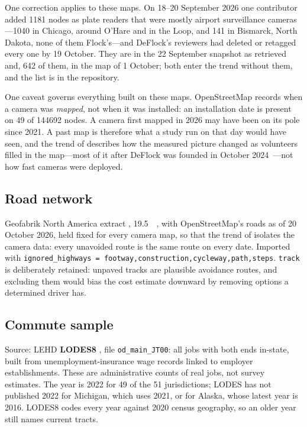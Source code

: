 \documentclass[11pt,twoside]{article}
\begin{document}
One correction applies to these maps. On 18--20 September 2026 one contributor added
\num{1181} nodes as plate readers that were mostly airport surveillance cameras---\num{1040} in
Chicago, around O'Hare and in the Loop, and 141 in Bismarck, North Dakota, none of them
Flock's---and DeFlock's reviewers had deleted or retagged every one by 19 October. They are in
the 22 September snapshot as retrieved and, 642 of them, in the map of 1 October; both enter
the trend without them, and the list is in the repository.

One caveat governs everything built on these maps. OpenStreetMap records when a camera was
\emph{mapped}, not when it was installed: an installation date is present on 49 of
\num{144692} nodes. A camera first mapped in 2026 may have been on its pole since 2021. A
past map is therefore what a study run on that day would have seen, and the trend of
 describes how the measured picture changed as volunteers filled
in the map---most of it after DeFlock was founded in October
2024~\citep{deflock}---not how fast cameras were deployed.

\subsection{Road network}
\label{sec:data:roads}

Geofabrik North America extract \citep{geofabrik}, \SI{19.5}{\giga\byte}, with OpenStreetMap's
roads as of 20 October 2026, held fixed for every camera map, so that the trend of  isolates the
camera data: every unavoided route is the same route on every date. Imported with
\texttt{ignored\_highways = footway,\allowbreak construction,\allowbreak cycleway,\allowbreak path,\allowbreak steps}. \texttt{track} is
deliberately retained: unpaved tracks are plausible avoidance routes, and excluding them
would bias the cost estimate downward by removing options a determined driver has.

\subsection{Commute sample}
\label{sec:data:commutes}

Source: LEHD \textbf{LODES8} \citep{lodes8}, file \texttt{od\_main\_JT00}: all jobs with both
ends in-state, built from unemployment-insurance wage records linked to employer
establishments. These are
administrative counts of real jobs, not survey estimates. The year is 2022 for 49 of the 51
jurisdictions; LODES has not published 2022 for Michigan, which uses 2021, or for Alaska,
whose latest year is 2016. LODES8 codes every year against 2020 census geography, so an
older year still names current tracts.
\end{document}
